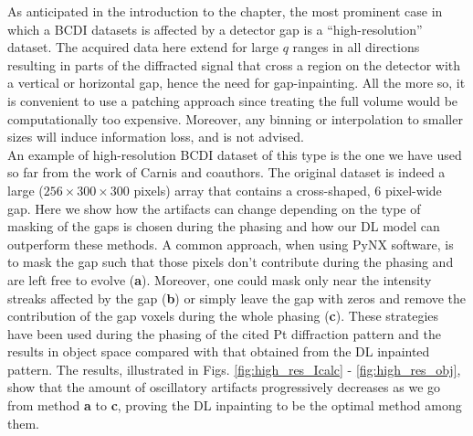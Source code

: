 As anticipated in the introduction to the chapter, the most prominent case in which a BCDI datasets is affected by 
a detector gap is a ``high-resolution'' dataset. The acquired data here extend for large $q$ ranges in all
directions resulting in parts of the diffracted signal that cross a region 
on the detector with a vertical or horizontal gap, hence the need for gap-inpainting. All the more so, it is convenient to use a
patching approach since treating the full volume would be computationally too expensive. Moreover, any binning or interpolation
to smaller sizes will induce information loss, and is not advised. \\
An example of high-resolution BCDI dataset of this type is the one we have used so far from the work of Carnis and coauthors. 
The original dataset is indeed a large ($256\times300\times300$ pixels) array that contains a cross-shaped, 6 pixel-wide 
gap. Here we show how the artifacts can change depending on the type of masking of the gaps is chosen during the phasing
and how our DL model can outperform these methods. 
A common approach, when using PyNX software, is to mask the gap such that those pixels don't contribute during the 
phasing and are left free to evolve (\textbf{a}). Moreover, one could mask only near the intensity streaks affected 
by the gap (\textbf{b}) or simply leave the gap with zeros and remove the contribution of the gap voxels during the whole phasing
(\textbf{c}). These strategies have been used during the phasing of the cited Pt diffraction pattern and the results 
in object space compared with that obtained from the DL inpainted pattern. The results, illustrated in Figs. \ref{fig:high_res_Icalc}
- \ref{fig:high_res_obj}, show that the amount of oscillatory artifacts progressively decreases as we go from method 
\textbf{a} to \textbf{c}, proving the DL inpainting to be the optimal method among them. 

